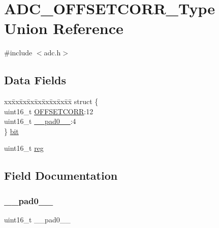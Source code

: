 \hypertarget{union_a_d_c___o_f_f_s_e_t_c_o_r_r___type}{}\section{A\+D\+C\+\_\+\+O\+F\+F\+S\+E\+T\+C\+O\+R\+R\+\_\+\+Type Union Reference}
\label{union_a_d_c___o_f_f_s_e_t_c_o_r_r___type}


{\ttfamily \#include $<$adc.\+h$>$}

\subsection*{Data Fields}
\begin{DoxyCompactItemize}
\item 
\begin{tabbing}
xx\=xx\=xx\=xx\=xx\=xx\=xx\=xx\=xx\=\kill
struct \{\\
\>uint16\_t \mbox{\hyperlink{union_a_d_c___o_f_f_s_e_t_c_o_r_r___type_a09a2a9296df5760b3b6023a4fb92b272}{OFFSETCORR}}:12\\
\>uint16\_t \mbox{\hyperlink{union_a_d_c___o_f_f_s_e_t_c_o_r_r___type_a77132c2c26a75f5b8751b235cda23828}{\_\_pad0\_\_}}:4\\
\} \mbox{\hyperlink{union_a_d_c___o_f_f_s_e_t_c_o_r_r___type_a7234412b2565401c0ed6279ea1852e3b}{bit}}\\

\end{tabbing}\item 
uint16\+\_\+t \mbox{\hyperlink{union_a_d_c___o_f_f_s_e_t_c_o_r_r___type_a11760f5020019f4aa8cb02e694f7cc44}{reg}}
\end{DoxyCompactItemize}


\subsection{Field Documentation}
\mbox{\label{union_a_d_c___o_f_f_s_e_t_c_o_r_r___type_a77132c2c26a75f5b8751b235cda23828}} 
\subsubsection{\texorpdfstring{\_\_pad0\_\_}{\_\_pad0\_\_}}
{\footnotesize\ttfamily uint16\+\_\+t \+\_\+\+\_\+pad0\+\_\+\+\_\+}

